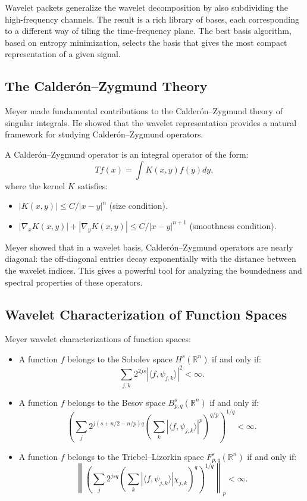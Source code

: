 Wavelet packets generalize the wavelet decomposition by also subdividing the high-frequency channels. The result is a rich library of bases, each corresponding to a different way of tiling the time-frequency plane. The best basis algorithm, based on entropy minimization, selects the basis that gives the most compact representation of a given signal.

\subsection{The Calder\'on--Zygmund Theory}

Meyer made fundamental contributions to the Calder\'on--Zygmund theory of singular integrals. He showed that the wavelet representation provides a natural framework for studying Calder\'on--Zygmund operators.

A Calder\'on--Zygmund operator is an integral operator of the form:
\[
Tf(x) = \int K(x,y) f(y) dy,
\]
where the kernel $K$ satisfies:
\begin{itemize}
\item $|K(x,y)| \leq C/|x-y|^n$ (size condition).
\item $|\nabla_x K(x,y)| + |\nabla_y K(x,y)| \leq C/|x-y|^{n+1}$ (smoothness condition).
\end{itemize}

Meyer showed that in a wavelet basis, Calder\'on--Zygmund operators are nearly diagonal: the off-diagonal entries decay exponentially with the distance between the wavelet indices. This gives a powerful tool for analyzing the boundedness and spectral properties of these operators.

\subsection{Wavelet Characterization of Function Spaces}

Meyer wavelet characterizations of function spaces:
\begin{itemize}
\item A function $f$ belongs to the Sobolev space $H^s(\mathbb{R}^n)$ if and only if:
\[
\sum_{j,k} 2^{2js} |\langle f, \psi_{j,k} \rangle|^2 < \infty.
\]
\item A function $f$ belongs to the Besov space $B^s_{p,q}(\mathbb{R}^n)$ if and only if:
\[
\left(\sum_j 2^{j(s + n/2 - n/p)q} \left(\sum_k |\langle f, \psi_{j,k} \rangle|^p\right)^{q/p}\right)^{1/q} < \infty.
\]
\item A function $f$ belongs to the Triebel--Lizorkin space $F^s_{p,q}(\mathbb{R}^n)$ if and only if:
\[
\left\|\left(\sum_j 2^{jsq} \left(\sum_k |\langle f, \psi_{j,k} \rangle| \chi_{j,k}\right)^q\right)^{1/q}\right\|_p < \infty.
\]
\end{itemize}

